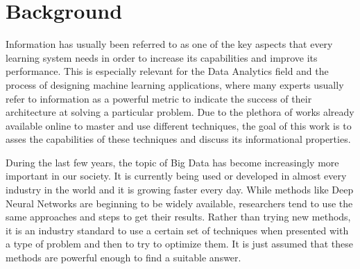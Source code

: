 \label{chap:Introduction}

\section{Background}
Information has usually been referred to as one of the key aspects that every learning system needs in order to increase its capabilities and improve its performance. This is especially relevant for the Data Analytics field and the process of designing machine learning applications, where many experts usually refer to information as a powerful metric to indicate the success of their architecture at solving a particular problem. Due to the plethora of works already available online to master and use different techniques, the goal of this work is to asses the capabilities of these techniques and discuss its informational properties. 


During the last few years, the topic of Big Data has become increasingly more important in our society. It is currently being used or developed in almost every industry in the world \cite{article_Big_Data} and it is growing faster every day. While methods like Deep Neural Networks are beginning to be  widely available,  researchers tend to use the same approaches and steps to get their results. Rather than trying new methods, it is an industry standard to use a certain set of techniques when presented with a type of problem and then to try to optimize them. It is just assumed that these methods are powerful enough to find a suitable answer. 

